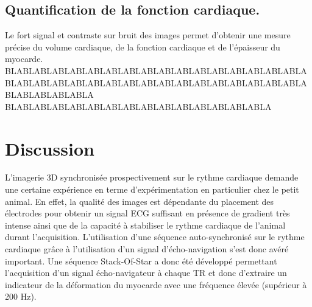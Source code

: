 \subsection{Quantification de la fonction cardiaque.}

Le fort signal et contraste sur bruit des images permet d'obtenir une mesure précise du volume cardiaque, de la fonction cardiaque et de l'épaisseur du myocarde.
BLABLABLABLABLABLABLABLABLABLABLABLABLABLABLABLABLABLABLABLABLABLABLABLABLABLABLABLABLABLABLABLABLABLABLABLABLABLABLA
BLABLABLABLABLABLABLABLABLABLABLABLABLABLABLA

\section{Discussion}

L'imagerie 3D synchronisée prospectivement sur le rythme cardiaque demande une certaine expérience en terme d'expérimentation en particulier chez le petit animal. En effet, la qualité des images est dépendante du placement des électrodes pour obtenir un signal ECG suffisant en présence de gradient très intense ainsi que de la capacité à stabiliser le rythme cardiaque de l'animal durant l'acquisition. L'utilisation d'une séquence auto-synchronisé sur le rythme cardiaque grâce à l'utilisation d'un signal d'écho-navigation s'est donc avéré important. Une séquence Stack-Of-Star a donc été développé permettant l'acquisition d'un signal écho-navigateur à chaque TR et donc d'extraire un indicateur de la déformation du myocarde avec une fréquence élevée (supérieur à 200 Hz).

